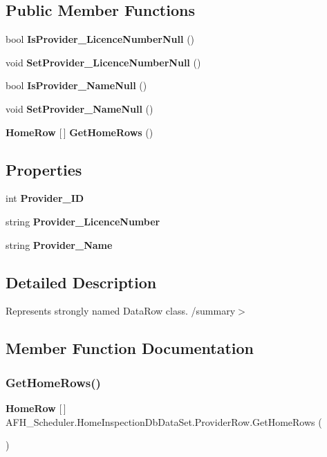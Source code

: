 \subsection*{Public Member Functions}
\begin{DoxyCompactItemize}
\item 
bool \textbf{ Is\+Provider\+\_\+\+Licence\+Number\+Null} ()
\item 
void \textbf{ Set\+Provider\+\_\+\+Licence\+Number\+Null} ()
\item 
bool \textbf{ Is\+Provider\+\_\+\+Name\+Null} ()
\item 
void \textbf{ Set\+Provider\+\_\+\+Name\+Null} ()
\item 
\textbf{ Home\+Row} [$\,$] \textbf{ Get\+Home\+Rows} ()
\end{DoxyCompactItemize}
\subsection*{Properties}
\begin{DoxyCompactItemize}
\item 
int \textbf{ Provider\+\_\+\+ID}\hspace{0.3cm}{\ttfamily  [get, set]}
\item 
string \textbf{ Provider\+\_\+\+Licence\+Number}\hspace{0.3cm}{\ttfamily  [get, set]}
\item 
string \textbf{ Provider\+\_\+\+Name}\hspace{0.3cm}{\ttfamily  [get, set]}
\end{DoxyCompactItemize}


\subsection{Detailed Description}
Represents strongly named Data\+Row class. /summary$>$ 

\subsection{Member Function Documentation}
\mbox{\label{class_a_f_h___scheduler_1_1_home_inspection_db_data_set_1_1_provider_row_a0bcdf5a24a14228a785583465505e895}} 
\subsubsection{GetHomeRows()}
{\footnotesize\ttfamily \textbf{ Home\+Row} [$\,$] A\+F\+H\+\_\+\+Scheduler.\+Home\+Inspection\+Db\+Data\+Set.\+Provider\+Row.\+Get\+Home\+Rows (\begin{DoxyParamCaption}{ }\end{DoxyParamCaption})}

